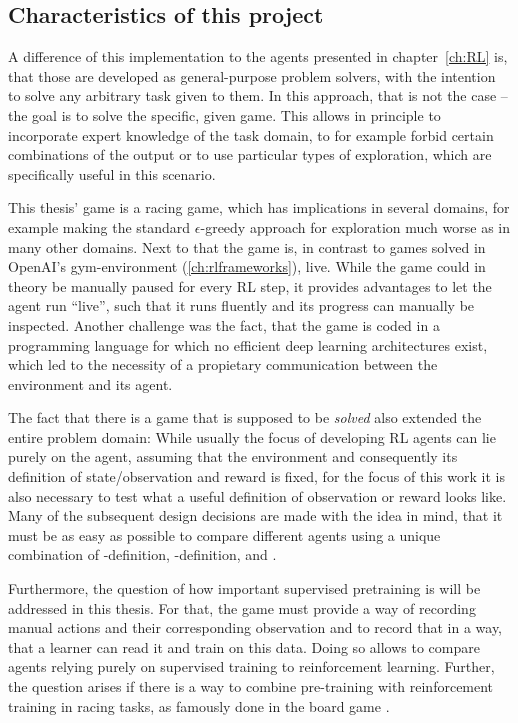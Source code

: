 \subsection{Characteristics of this project} \label{ch:projectcharacteristics}

A difference of this implementation to the agents presented in chapter~\ref{ch:RL} is, that those are developed as general-purpose problem solvers, with the intention to solve any arbitrary task given to them. In this approach, that is not the case -- the goal is to solve the specific, given game. This allows in principle to incorporate expert knowledge of the task domain, to for example forbid certain combinations of the output or to use particular types of exploration, which are specifically useful in this scenario. 

This thesis' game is a racing game, which has implications in several domains, for example making the standard $\epsilon$-greedy approach for exploration much worse as in many other domains. Next to that the game is, in contrast to games solved in OpenAI's gym-environment (\ref{ch:rlframeworks}), live. While the game could in theory be manually paused for every RL step, it provides advantages to let the agent run ``live'', such that it runs fluently and its progress can manually be inspected. Another challenge was the fact, that the game is coded in a programming language for which no efficient deep learning architectures exist, which led to the necessity of a propietary communication between the environment and its agent.

The fact that there is a game that is supposed to be \textit{solved} also extended the entire problem domain: While usually the focus of developing RL agents can lie purely on the agent, assuming that the environment and consequently its definition of state/observation and reward is fixed, for the focus of this work it is also necessary to test what a useful definition of observation or reward looks like. Many of the subsequent design decisions are made with the idea in mind, that it must be as easy as possible to compare different agents using a unique combination of -definition, -definition,  and . 

Furthermore, the question of how important supervised pretraining is will be addressed in this thesis. For that, the game must provide a way of recording manual actions and their corresponding observation and to record that in a way, that a learner can read it and train on this data. Doing so allows to compare agents relying purely on supervised training to reinforcement learning. Further, the question arises if there is a way to combine pre-training with reinforcement training in racing tasks, as famously done in the board game \cite{silver_mastering_2016}.

